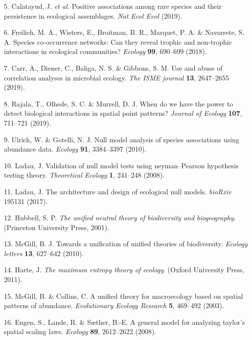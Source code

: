 \documentclass[]{article}
\begin{document}
\hypertarget{ref-calatayud2019}{}
5. Calatayud, J. \emph{et al.} Positive associations among rare species
and their persistence in ecological assemblages. \emph{Nat Ecol Evol}
(2019).

\hypertarget{ref-freilich2018}{}
6. Freilich, M. A., Wieters, E., Broitman, B. R., Marquet, P. A. \&
Navarrete, S. A. Species co-occurrence networks: Can they reveal trophic
and non-trophic interactions in ecological communities? \emph{Ecology}
\textbf{99}, 690--699 (2018).

\hypertarget{ref-carr2019}{}
7. Carr, A., Diener, C., Baliga, N. S. \& Gibbons, S. M. Use and abuse
of correlation analyses in microbial ecology. \emph{The ISME journal}
\textbf{13}, 2647--2655 (2019).

\hypertarget{ref-rajala2019}{}
8. Rajala, T., Olhede, S. C. \& Murrell, D. J. When do we have the power
to detect biological interactions in spatial point patterns?
\emph{Journal of Ecology} \textbf{107}, 711--721 (2019).

\hypertarget{ref-ulrich2010}{}
9. Ulrich, W. \& Gotelli, N. J. Null model analysis of species
associations using abundance data. \emph{Ecology} \textbf{91},
3384--3397 (2010).

\hypertarget{ref-ladau2008}{}
10. Ladau, J. Validation of null model tests using neyman--Pearson
hypothesis testing theory. \emph{Theoretical Ecology} \textbf{1},
241--248 (2008).

\hypertarget{ref-ladau2017}{}
11. Ladau, J. The architecture and design of ecological null models.
\emph{bioRxiv} 195131 (2017).

\hypertarget{ref-hubbell2001}{}
12. Hubbell, S. P. \emph{The unified neutral theory of biodiversity and
biogeography}. (Princeton University Press, 2001).

\hypertarget{ref-mcgill2010}{}
13. McGill, B. J. Towards a unification of unified theories of
biodiversity. \emph{Ecology letters} \textbf{13}, 627--642 (2010).

\hypertarget{ref-harte2011}{}
14. Harte, J. \emph{The maximum entropy theory of ecology}. (Oxford
University Press, 2011).

\hypertarget{ref-mcgill2003}{}
15. McGill, B. \& Collins, C. A unified theory for macroecology based on
spatial patterns of abundance. \emph{Evolutionary Ecology Research}
\textbf{5}, 469--492 (2003).

\hypertarget{ref-engen2008}{}
16. Engen, S., Lande, R. \& Sæther, B.-E. A general model for analyzing
taylor's spatial scaling laws. \emph{Ecology} \textbf{89}, 2612--2622
(2008).
\end{document}
